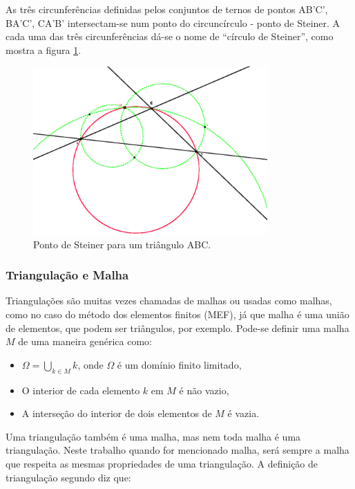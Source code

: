 As três circunferências definidas pelos conjuntos de ternos de pontos AB’C’, BA’C’, CA’B’ intersectam-se num ponto do circuncírculo - ponto de Steiner. A cada uma das três circunferências dá-se o nome de “círculo de Steiner”, como mostra a figura \ref{fig:steiner}.

 \begin{figure}[htbp]
     \centering
     \includegraphics[width=0.8\textwidth]{fig/steiner.png}
     \caption{Ponto de Steiner para um triângulo ABC.} 
     \label{fig:steiner}
 \end{figure}

\subsubsection{Triangulação e Malha}

Triangulações são muitas vezes chamadas de malhas ou usadas como malhas, como no caso do método dos elementos finitos (MEF), já que malha é uma união de elementos, que podem ser triângulos, por exemplo. Pode-se definir uma malha $M$ de uma maneira genérica como:

\begin{itemize}
 \item $\varOmega = \bigcup\limits_{k \in M} k $, onde $\varOmega$ é um domínio finito limitado,
 \item O interior de cada elemento $k$ em $M$ é não vazio,
 \item A interseção do interior de dois elementos de $M$ é vazia.
\end{itemize}

Uma triangulação também é uma malha, mas nem toda malha é uma triangulação. Neste trabalho quando for mencionado malha, será sempre a malha que respeita as mesmas propriedades de uma triangulação. A definição de triangulação segundo \cite{bib:Triangulations_applications} diz que:

